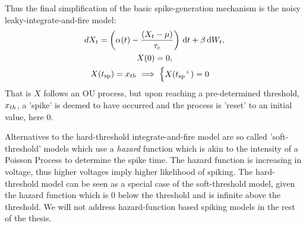 Thus the final simplification of the basic spike-generation mechanism is the
noisy leaky-integrate-and-fire model: 
\begin{equation}
\begin{gathered}
dX_t = \left(\alpha(t) - \frac{(X_t - {\mu })}{{ \tau_{c} }} \right) \, \mathrm{d} t + \beta \, \mathrm{d} W_t,
\\
X(0) = 0,
\\
X({ t_{\textrm{sp} } }) = { x_{th} } \implies  
\begin{cases}
X({ t_{\textrm{sp} } }^+) = 0 &  
\end{cases}
\end{gathered}
\label{eq:X_evolution_uo}
\end{equation}
That is $X$ follows an OU process, but upon reaching a pre-determined threshold,
${ x_{th} }$, a 'spike' is deemed to have occurred and the process is 'reset' to an
initial value, here $0$.

Alternatives to the hard-threshold integrate-and-fire model are so called
'soft-threshold' models which use a {\sl hazard} function which is akin to the
intensity of a Poisson Process to determine the spike time. The hazard function
is increasing in voltage, thus higher voltages imply higher likelihood of
spiking. The hard-threshold model can be seen as a special case of the
soft-threshold model, given the hazard function which is 0 below the threshold
and is infinite above the threshold. We will not address hazard-function based
spiking models in the rest of the thesis. 
